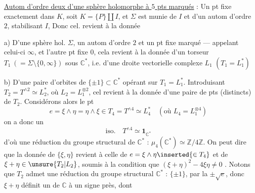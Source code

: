 \uline{Autom d'ordre deux d'une sphère holomorphe \inserted{$\Sigma$} à
 $5$ pts marqués} : Un pt fixe exactement dans $K$,
soit $K=\{P\}\amalg I$, et $\Sigma$ est munie de $I$ et d'un autom
\inserted{$\sigma$} d'ordre $2$, stabilisant $I$,
Donc cel. revient à la donnée

a) D'une sphère hol. $\Sigma$, un autom \inserted{$\sigma$} d'ordre $2$
et un pt fixe marqué --- appelant celui-ci $\infty$, et l'autre pt fixe $0$,
cela revient à la donnée d'un torseur $T_1\ (= \Sigma\setminus\{0,\infty\})$
sous $\mathbb C^*$, i.e. d'une droite vectorielle complexe $L_1$
$(T_1=L_1^*)$

b) D'une paire d'orbites  de
$\{\pm1\}\subset\mathbb C^*$ opérant sur $T_1=L_1^*$.
Introduisant $T_2=T^{\wedge2}\simeq L_2^*$, où
$L_2=L_1^{\otimes2}$, cel revient à la donnée d'une paire de pts
\inserted{$\{\xi,\eta\}$} (distincts) de $T_2$.
Considérons alors le pt
\[
 e=\xi\wedge\eta=\eta\wedge\xi
 \in T_4=T^{\wedge4}\simeq L_4^*
 \quad(\text{où }L_4=L_1^{\otimes4})
\]
on a donc un
\[
 \mathrm{iso.}\quad T^{\wedge4}\simeq\mathbf1_{\mathbb C^*}
\]
d'où une réduction du groupe structural 
de $\mathbb C^*$ : $\mu_4(\mathbb C^*)\simeq\mathbb Z/4\mathbb Z$.
On peut dire que la donnée de $\{\xi,\eta\}$ revient à celle de
$e=\xi\wedge\eta\inserted{\in T_4}$ et de
$\xi+\eta\in\unsure{T_2|L_2}$, soumis à la condition que
$(\xi+\eta)^2-4\xi\eta\ne0$ .
Notons 
que $T_2$ admet une réduction du groupe structural $\mathbb C^*$ :
$\{\pm1\}$, par la  $\pm\sqrt e$, donc $\xi+\eta$
définit un  de $\mathbb C$ à un signe près, dont
  


  




  

 


 




